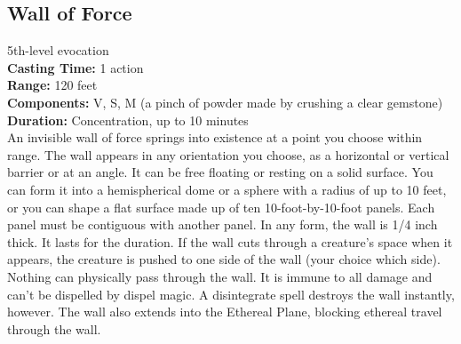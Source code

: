 \documentclass[11pt, A4paper, english]{article}
\begin{document}
		\subsection{Wall of Force}
5th-level evocation \\
\textbf{Casting Time:} 1 action \\
\textbf{Range:} 120 feet \\
\textbf{Components:} V, S, M (a pinch of powder made by crushing a clear gemstone) \\
\textbf{Duration:} Concentration, up to 10 minutes \\
An invisible wall of force springs into existence at a point you choose within range. The wall appears in any orientation you choose, as a horizontal or vertical barrier or at an angle. It can be free floating or resting on a solid surface. You can form it into a hemispherical dome or a sphere with a radius of up to 10 feet, or you can shape a flat surface made up of ten 10-foot-by-10-foot panels. Each panel must be contiguous with another panel. In any form, the wall is 1/4 inch thick. It lasts for the duration. If the wall cuts through a creature's space when it appears, the creature is pushed to one side of the wall (your choice which side). \\
Nothing can physically pass through the wall. It is immune to all damage and can't be dispelled by dispel magic. A disintegrate spell destroys the wall instantly, however. The wall also extends into the Ethereal Plane, blocking ethereal travel through the wall.
\end{document}
